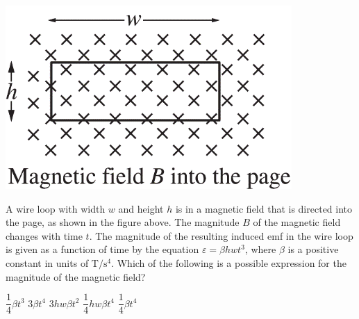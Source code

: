 
\begin{center}
    \includegraphics[scale=0.4]{images/img-016-031.png}
\end{center}

\begin{questions}
\setcounter{question}{34}

\question
A wire loop with width $w$ and height $h$ is in a magnetic field that is directed into the page, as shown in the figure above. The magnitude $B$ of the magnetic field changes with time $t$. The magnitude of the resulting induced emf in the wire loop is given as a function of time by the equation $\varepsilon=\beta h w t^{3}$, where $\beta$ is a positive constant in units of $\mathrm{T} / \mathrm{s}^{4}$. Which of the following is a possible expression for the magnitude of the magnetic field?

\begin{oneparchoices}
    \choice $\dfrac{1}{4} \beta t^{3}$
    \choice $3 \beta t^{4}$
    \choice $3 h w \beta t^{2}$
    \choice $\dfrac{1}{4} h w \beta t^{4}$
    \choice $\dfrac{1}{4} \beta t^{4}$
\end{oneparchoices}

\end{questions}
